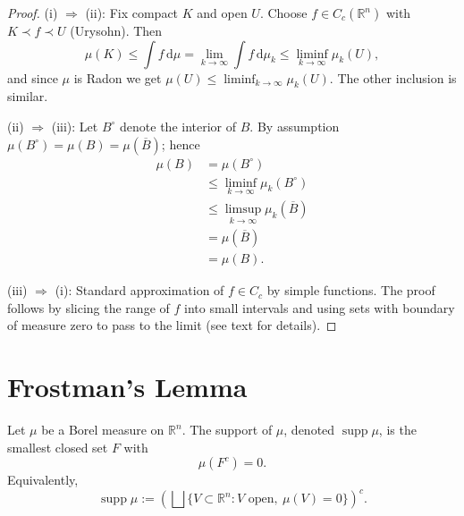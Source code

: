     \begin{proof}
    (i) $\Rightarrow$ (ii): Fix compact $K$ and open $U$. Choose $f\in C_{c}(\mathbb{R}^{n})$ with $K\prec f\prec U$ (Urysohn). Then
    \begin{equation*}
        \mu(K)\leq \int f\,\mathrm{d}\mu=\lim_{ k \to \infty } \int f\,\mathrm{d}\mu _{k}\leq \liminf_{k\to \infty}\mu _{k}(U),
    \end{equation*}
    and since $\mu$ is Radon we get $\mu(U)\leq \liminf_{k\to \infty}\mu _{k}(U)$. The other inclusion is similar.

    (ii) $\Rightarrow$ (iii): Let $B^{\circ}$ denote the interior of $B$. By assumption $\mu(B^{\circ})=\mu(B)=\mu(\overline{B})$; hence
    \begin{align*}
        \mu(B) & =\mu(B^{\circ}) \\
         & \leq \liminf_{k\to \infty} \mu _{k}(B^{\circ}) \\
         & \leq \limsup_{ k \to \infty } \mu _{k}(\overline{B}) \\
         & =\mu(\overline{B}) \\
         & =\mu(B).
    \end{align*}

    (iii) $\Rightarrow$ (i): Standard approximation of $f\in C_{c}$ by simple functions. The proof follows by slicing the range of $f$ into small intervals and using sets with boundary of measure zero to pass to the limit (see text for details).
    \end{proof}

    \section{Frostman's Lemma}

    \begin{definition}
    Let $\mu$ be a Borel measure on $\mathbb{R}^{n}$. The support of $\mu$, denoted $\operatorname{supp}\mu$, is the smallest closed set $F$ with
        \begin{equation*}
            \mu(F^{c})=0.
        \end{equation*}
    Equivalently,
        \begin{equation*}
            \operatorname{supp}\mu:=\left(\bigsqcup\{ V \subset \mathbb{R}^{n}: V\text{ open},\ \mu(V)=0 \}\right)^{c}.
        \end{equation*}
    \end{definition}

